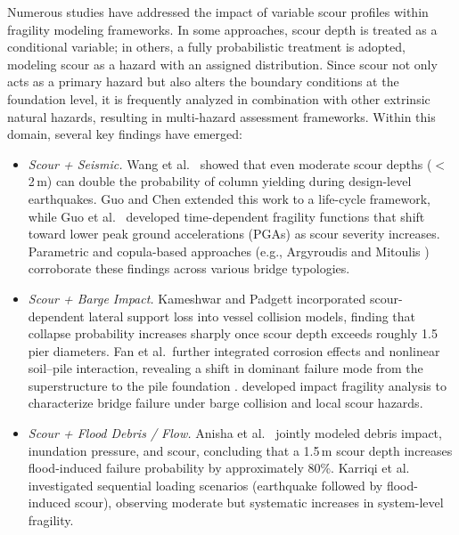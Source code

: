 \documentclass[authoryear,preprint,review,12pt]{elsarticle}
\begin{document}
Numerous studies have addressed the impact of variable scour profiles within fragility modeling frameworks. In some approaches, scour depth is treated as a conditional variable; in others, a fully probabilistic treatment is adopted, modeling scour as a hazard with an assigned distribution. Since scour not only acts as a primary hazard but also alters the boundary conditions at the foundation level, it is frequently analyzed in combination with other extrinsic natural hazards, resulting in multi-hazard assessment frameworks. Within this domain, several key findings have emerged:

\begin{itemize}
    \item \textit{Scour + Seismic.} Wang et al.\ \citep{Wang2014} showed that even moderate scour depths ($<$ 2\,m) can double the probability of column yielding during design-level earthquakes. Guo and Chen \citep{Guo2015} extended this work to a life-cycle framework, while Guo et al.\ \citep{Guo2016} developed time-dependent fragility functions that shift toward lower peak ground accelerations (PGAs) as scour severity increases. Parametric and copula-based approaches (e.g., Argyroudis and Mitoulis \citep{Argyroudis2021}) corroborate these findings across various bridge typologies.
    \item \textit{Scour + Barge Impact.} Kameshwar and Padgett \citep{Kameshwar2018} incorporated scour-dependent lateral support loss into vessel collision models, finding that collapse probability increases sharply once scour depth exceeds roughly 1.5 pier diameters. Fan et al.\ further integrated corrosion effects and nonlinear soil–pile interaction, revealing a shift in dominant failure mode from the superstructure to the pile foundation \citep{Fan2021}. \citet{guo2023probabilistic} developed impact fragility analysis to characterize bridge failure under barge collision and local scour hazards.
    
    \item \textit{Scour + Flood Debris / Flow.} Anisha et al.\ \citep{Anisha2022} jointly modeled debris impact, inundation pressure, and scour, concluding that a 1.5\,m scour depth increases flood-induced failure probability by approximately 80\%. Karriqi et al.\ \citep{Karriqi2024} investigated sequential loading scenarios (earthquake followed by flood-induced scour), observing moderate but systematic increases in system-level fragility.
\end{itemize}
\end{document}
